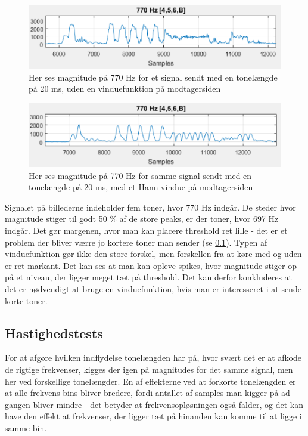 \begin{figure}[h]
\centering
\includegraphics[scale=0.8]{Billeder/NoWindow.PNG}
\caption{Her ses magnitude på 770 Hz for et signal sendt med en tonelængde på 20 ms, uden en vinduefunktion på modtagersiden}
\label{fig:NoWindow}
\end{figure}

\begin{figure}[h]
\centering
\includegraphics[scale=0.8]{Billeder/HannWindow.PNG}
\caption{Her ses magnitude på 770 Hz for samme signal sendt med en tonelængde på 20 ms, med et Hann-vindue på modtagersiden}
\label{fig:NoWindow}
\end{figure}

Signalet på billederne indeholder fem toner, hvor 770 Hz indgår. De steder hvor magnitude stiger til godt 50 \% af de store peaks, er der toner, hvor 697 Hz indgår. Det gør margenen, hvor man kan placere threshold ret lille - det er et problem der bliver værre jo kortere toner man sender (se \ref{sec:hastighedstest}). Typen af vinduefunktion gør ikke den store forskel, men forskellen fra at køre med og uden er ret markant. Det kan ses at man kan opleve spikes, hvor magnitude stiger op på et niveau, der ligger meget tæt på threshold. Det kan derfor konkluderes at det er nødvendigt at bruge en vinduefunktion, hvis man er interesseret i at sende korte toner.

\subsection{Hastighedstests} \label{sec:hastighedstest}

For at afgøre hvilken indflydelse tonelængden har på, hvor svært det er at afkode de rigtige frekvenser, kigges der igen på magnitudes for det samme signal, men her ved forskellige tonelængder. En af effekterne ved at forkorte tonelængden er at alle frekvens-bins bliver bredere, fordi antallet af samples man kigger på ad gangen bliver mindre - det betyder at frekvensopløsningen også falder, og det kan have den effekt at frekvenser, der ligger tæt på hinanden kan komme til at ligge i samme bin. 

